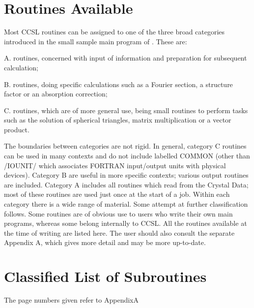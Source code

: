 \section{Routines Available}
Most CCSL routines can be assigned to one of the three broad categories
introduced in the small sample main program of .  These are:
\p
\begin{list} {} {\setlength{\labelwidth}{20mm}
  \setlength{\parsep}{-1ex}
  \setlength{\leftmargin}{\labelwidth}
 \addtolength{\leftmargin}{5mm}}
 \label{chap2:groups}
\item[A. \hfill]  routines, concerned with input of information and 
     preparation for subsequent calculation;
\item[B. \hfill]  routines, doing specific calculations such as a
       Fourier section, a structure factor or an absorption correction; 
\item[C. \hfill]  routines, which are of more general use, being small
       routines to perform tasks such as the solution of spherical triangles,
       matrix multiplication or a vector product.\end{list}
\p
The boundaries between categories are not rigid.  In general, category C
routines can be used in many contexts and do not include labelled COMMON
(other than /IOUNIT/ which associates FORTRAN input/output units with
physical devices).  Category B are useful in more specific contexts;
various output routines are included.  Category A includes all routines
which read from the Crystal Data; most of these routines are used just once
at the start of a job.
\pn
Within each category there is a wide range of material.  Some attempt at
further classification follows.  Some routines are of obvious use to
users who write their own main programs, whereas some belong internally
to CCSL.
\p 
All the routines available at the time of writing are listed here.  The
user should also consult the separate Appendix A, which gives more detail
and may be more up-to-date.
%
{\section{Classified List of Subroutines \label{routines:lis}}
The page numbers given refer to AppendixA\\[0.5ex]

}
\finchapter
%
